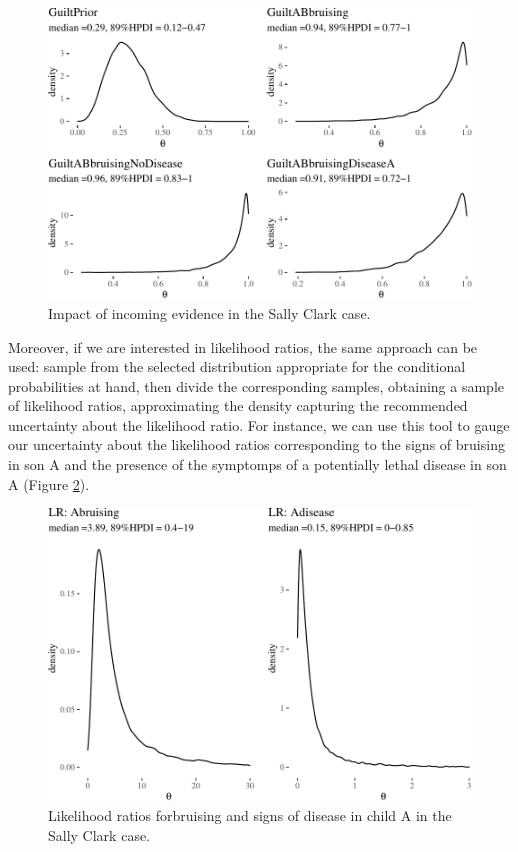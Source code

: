 \documentclass[
  10pt,
  dvipsnames,enabledeprecatedfontcommands]{scrartcl}
\begin{document}
\begin{figure}

\begin{center}\includegraphics[width=0.9\linewidth]{chapter-outline_files/figure-latex/SCwithHOP2-1} \end{center}


\caption{Impact of incoming evidence in the Sally Clark case.}
\label{fig:SCwithHOP2}
\end{figure}

Moreover, if we are interested in likelihood ratios, the same approach
can be used: sample from the selected distribution appropriate for the
conditional probabilities at hand, then divide the corresponding
samples, obtaining a sample of likelihood ratios, approximating the
density capturing the recommended uncertainty about the likelihood
ratio. For instance, we can use this tool to gauge our uncertainty about
the likelihood ratios corresponding to the signs of bruising in son A
and the presence of the symptomps of a potentially lethal disease in son
A (Figure \ref{fig:SClrs}).

\begin{figure}[H]


\begin{center}\includegraphics[width=0.9\linewidth]{chapter-outline_files/figure-latex/SClrs-1} \end{center}

\caption{Likelihood ratios forbruising and signs of disease in child A in the Sally Clark case.}
\label{fig:SClrs}

\end{figure}
\end{document}
